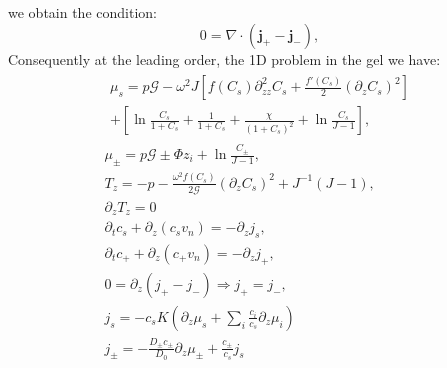 \documentclass[12pt]{extarticle}
\begin{document}
we obtain the condition:
\begin{equation}
0= \nabla\cdot(\mathbf{j}_+-\mathbf{j}_-),
\end{equation}
Consequently at the leading order, the 1D problem in the gel we have:
\begin{gather}
\begin{aligned}
\mu_s = p \mathcal{G}  - \omega^2 J \left[f(C_s)\partial_{zz}^2 C_s+\frac{f'(C_s)}{2}\left(\partial_z C_s\right)^2\right]\\
+ \left[\ln \frac{C_s}{1+C_s} + \frac{1}{1+C_s}+\frac{\chi}{(1+C_s)^2} + \ln \frac{C_s}{J-1} \right], 
\end{aligned}\\[2.5mm]
\mu_\pm = p \mathcal{G} \pm \Phi z_i + \ln \frac{C_\pm}{J-1} ,\\
T_z= -p -\frac{\omega^2 f(C_s)}{2\mathcal{G}} (\partial_z C_s)^2+ J^{-1}\left(J-1\right),\\
\partial_z T_z=0\\
\partial_t c_s + \partial_z (c_s v_n)=- \partial_z j_s,\\
\partial_t c_+ +\partial_z (c_+ v_n)= -\partial_zj_+,\\
0= \partial_z(j_+-j_-) \Rightarrow j_+=j_-,\\
j_s =-c_sK  \left(\partial_z\mu_s +\sum_i \frac{c_i}{c_s} \partial_z \mu_i\right)\\
j_\pm= - \frac{D_\pm c_\pm}{D_0}\partial_z \mu_\pm + \frac{c_\pm}{c_s}j_s
\end{gather}
\end{document}
